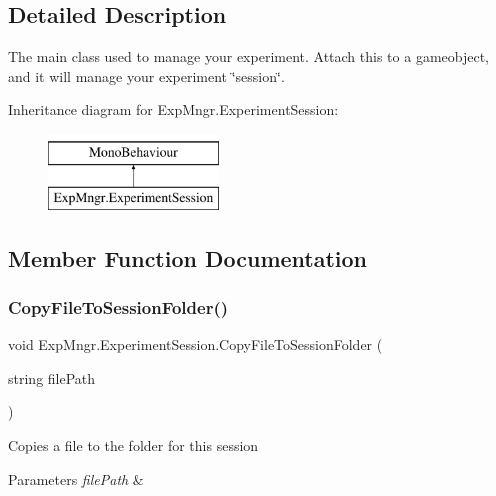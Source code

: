 \subsection{Detailed Description}
The main class used to manage your experiment. Attach this to a gameobject, and it will manage your experiment \char`\"{}session\char`\"{}. 

Inheritance diagram for Exp\+Mngr.\+Experiment\+Session\+:\begin{figure}[H]
\begin{center}
\leavevmode
\includegraphics[height=2.000000cm]{class_exp_mngr_1_1_experiment_session}
\end{center}
\end{figure}


\subsection{Member Function Documentation}
\mbox{\label{class_exp_mngr_1_1_experiment_session_ab1307a5e616ae5afb588ddcfec4c5dd6}} 
\subsubsection{\texorpdfstring{Copy\+File\+To\+Session\+Folder()}{CopyFileToSessionFolder()}\hspace{0.1cm}{\footnotesize\ttfamily [1/2]}}
{\footnotesize\ttfamily void Exp\+Mngr.\+Experiment\+Session.\+Copy\+File\+To\+Session\+Folder (\begin{DoxyParamCaption}\item[{string}]{file\+Path }\end{DoxyParamCaption})}



Copies a file to the folder for this session 


\begin{DoxyParams}{Parameters}
{\em file\+Path} & \\
\hline
\end{DoxyParams}
\mbox{\label{class_exp_mngr_1_1_experiment_session_a68aaa1dbe21a0369db6425beea64ed84}} 
